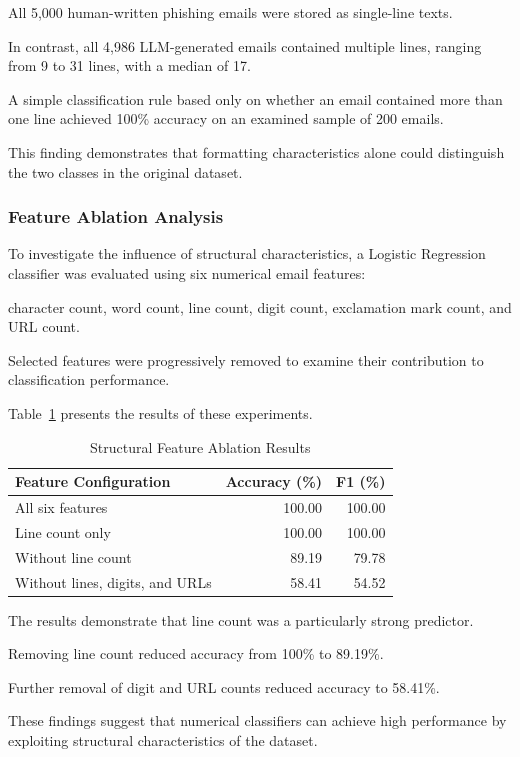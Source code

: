 \documentclass[sigconf,nonacm]{acmart}
\begin{document}
All 5,000 human-written phishing emails
were stored as single-line texts.

In contrast, all 4,986 LLM-generated emails
contained multiple lines, ranging from
9 to 31 lines, with a median of 17.

A simple classification rule based only
on whether an email contained more than
one line achieved 100\% accuracy on
an examined sample of 200 emails.

This finding demonstrates that formatting
characteristics alone could distinguish
the two classes in the original dataset.

\subsubsection{Feature Ablation Analysis}

To investigate the influence of structural
characteristics, a Logistic Regression
classifier was evaluated using six
numerical email features:

character count, word count, line count,
digit count, exclamation mark count,
and URL count.

Selected features were progressively
removed to examine their contribution
to classification performance.

Table~\ref{tab:ablation} presents the
results of these experiments.

\begin{table}[t]
\centering
\caption{Structural Feature Ablation Results}
\label{tab:ablation}
\footnotesize
\begin{tabular}{p{}rr}
\toprule
Feature Configuration &
Accuracy (\%) & F1 (\%) \\
\midrule
All six features & 100.00 & 100.00 \\
Line count only & 100.00 & 100.00 \\
Without line count & 89.19 & 79.78 \\
Without lines, digits,
and URLs & 58.41 & 54.52 \\
\bottomrule
\end{tabular}
\end{table}

The results demonstrate that line count
was a particularly strong predictor.

Removing line count reduced accuracy
from 100\% to 89.19\%.

Further removal of digit and URL counts
reduced accuracy to 58.41\%.

These findings suggest that numerical
classifiers can achieve high performance
by exploiting structural characteristics
of the dataset.
\end{document}
